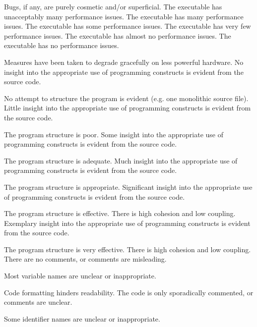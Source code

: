 \documentclass{../fal_assignment}
\begin{document}
\begin{markingrubric}
            \par Bugs, if any, are purely cosmetic and/or superficial.
%
        \grade\fail The executable has unacceptably many performance issues.
        \grade The executable has many performance issues.
        \grade The executable has some performance issues.
        \grade The executable has very few performance issues.
        \grade The executable has almost no performance issues.
        \grade The executable has no performance issues.
            \par Measures have been taken to degrade gracefully on less powerful hardware.
%
        \grade\fail No insight into the appropriate use of programming constructs is evident from the source code.
            \par No attempt to structure the program is evident (e.g. one monolithic source file).
        \grade Little insight into the appropriate use of programming constructs is evident from the source code.
            \par The program structure is poor.
        \grade Some insight into the appropriate use of programming constructs is evident from the source code.
            \par The program structure is adequate.
        \grade Much insight into the appropriate use of programming constructs is evident from the source code.
            \par The program structure is appropriate.
        \grade Significant insight into the appropriate use of programming constructs is evident from the source code.
            \par The program structure is effective. There is high cohesion and low coupling.
        \grade Exemplary insight into the appropriate use of programming constructs is evident from the source code.
            \par The program structure is very effective. There is high cohesion and low coupling.
%
        \grade\fail There are no comments, or comments are misleading.
            \par Most variable names are unclear or inappropriate.
            \par Code formatting hinders readability.
        \grade The code is only sporadically commented, or comments are unclear.
            \par Some identifier names are unclear or inappropriate.

\end{markingrubric}
\end{document}
